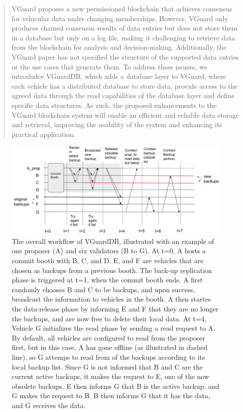 \begin{abstract}
VGuard proposes a new permissioned blockchain that achieves consensus for vehicular data under changing memberships. However, VGuard only produces chained consensus results of data entries but does not store them in a database but only on a log file, making it challenging to retrieve data from the blockchain for analysis and decision-making. Additionally, the VGuard paper has not specified the structure of the supported data entries or the use cases that generate them. To address these issuses, we introdudce VGuardDB, which adds a database layer to VGuard, where each vehicle has a distributed database to store data, provide access to the agreed data through the read capabilities of the database layer and define specific data structures. As such, the proposed enhancements to the VGuard blockchain system will enable an efficient and reliable data storage and retrieval, improving the usability of the system and enhancing its practical application.
\end{abstract}
\begin{figure}[t]
    \centering
    \includegraphics[width=\textwidth]{img/worflow.png}
    \caption{The overall workflow of VGuardDB, illustrated with an example of one proposer (A) and six validators (B to G). At t=0, A hosts a commit booth with B, C, and D. E, and F are vehicles that are chosen as backups from a previous booth. The back-up replication phase is triggered at t=1, when the commit booth ends. A first randomly chooses B and C to be backups, and upon success, broadcast the information to vehicles in the booth. A then startes the data-release phase by informing E and F that they are no longer the backups, and are now free to delete their local data. At t=4, Vehicle G initializes the read phase by sending a read request to A. By default, all vehicles are configured to read from the proposer first, but in this case, A has gone offline (as illustrated in dashed line), so G attemps to read from of the backups according to its local backup list. Since G is not informed that B and C are the current active backups, it makes the request to E, one of the now obsolete backups. E then informs G that B is the active backup, and G makes the request to B. B then informs G that it has the data, and G receives the data. }
    \label{fig:workflow}
\end{figure}
